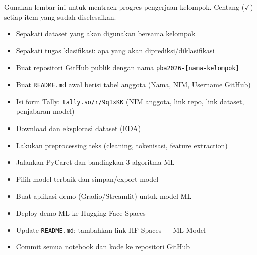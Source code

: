 \documentclass[11pt,a4paper]{article}
\begin{document}
\noindent Gunakan lembar ini untuk mentrack progres pengerjaan kelompok. Centang ($\checkmark$) setiap item yang sudah diselesaikan.

\vspace{1em}

\begin{tcolorbox}[enhanced, colback=checkpointbg, colframe=itera, fonttitle=\bfseries,
  title={Checkpoint 1 --- 18 Maret 2026: Dataset \& Registrasi}]
\begin{itemize}[leftmargin=1.5em, label=$\square$, noitemsep]
  \item Sepakati dataset yang akan digunakan bersama kelompok
  \item Sepakati tugas klasifikasi: apa yang akan diprediksi/diklasifikasi
  \item Buat repositori GitHub publik dengan nama \texttt{pba2026-[nama-kelompok]}
  \item Buat \texttt{README.md} awal berisi tabel anggota (Nama, NIM, Username GitHub)
  \item Isi form Tally: \href{https://tally.so/r/9q1xKK}{\texttt{tally.so/r/9q1xKK}} (NIM anggota, link repo, link dataset, penjabaran model)
\end{itemize}
\end{tcolorbox}

\vspace{0.5em}

\begin{tcolorbox}[enhanced, colback=checkpointbg, colframe=itera!70!green, fonttitle=\bfseries,
  title={Checkpoint 2 --- 8 April 2026: Model ML (PyCaret)}]
\begin{itemize}[leftmargin=1.5em, label=$\square$, noitemsep]
  \item Download dan eksplorasi dataset (EDA)
  \item Lakukan preprocessing teks (cleaning, tokenisasi, feature extraction)
  \item Jalankan PyCaret dan bandingkan 3 algoritma ML
  \item Pilih model terbaik dan simpan/export model
  \item Buat aplikasi demo (Gradio/Streamlit) untuk model ML
  \item Deploy demo ML ke Hugging Face Spaces
  \item Update \texttt{README.md}: tambahkan link HF Spaces --- ML Model
  \item Commit semua notebook dan kode ke repositori GitHub
\end{itemize}
\end{tcolorbox}
\end{document}
